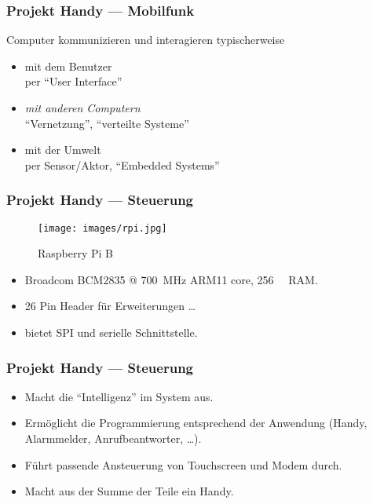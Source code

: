 \begin{frame}
	\frametitle{Projekt Handy --- Mobilfunk}

	\begin{block}{Computer kommunizieren und interagieren typischerweise}
		\begin{itemize}
			\item mit dem Benutzer\\
			per ``User Interface''
			\item \emph{mit anderen Computern} \\
			``Vernetzung'', ``verteilte Systeme''
			\item mit der Umwelt\\
			 per Sensor/Aktor, ``Embedded Systems''
		\end{itemize}
	\end{block}
\end{frame}

\begin{frame}
	\frametitle{Projekt Handy --- Steuerung}
	\begin{figure}
		\centering
		\texttt{[image: images/rpi.jpg]}
		\caption{Raspberry Pi B}
	\end{figure}
\vspace{-0,5cm}
	\begin{itemize}
		\item Broadcom BCM2835 @ \SI{700}{\mega\hertz} ARM11 core,
			\SI{256}{\mega\byte}  RAM.
		\item 26 Pin Header für Erweiterungen \ldots
		\item bietet SPI und serielle Schnittstelle.
	\end{itemize}
\end{frame}

\begin{frame}
	\frametitle{Projekt Handy --- Steuerung}

	\begin{itemize}
		\item Macht die ``Intelligenz'' im System aus.
		\item Ermöglicht die Programmierung entsprechend der Anwendung (Handy, Alarmmelder, Anrufbeantworter, \ldots).
		\item Führt passende Ansteuerung von Touchscreen und Modem durch.
		\item Macht aus der Summe der Teile ein Handy.
	\end{itemize}

\end{frame}

